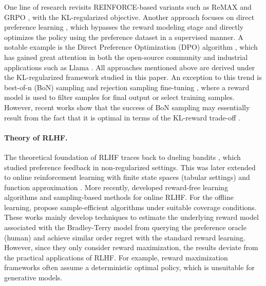 \documentclass[11pt]{article}
\begin{document}
One line of research revisits REINFORCE-based variants such as ReMAX and GRPO \citep{li2023remax, shao2024deepseekmath}, with the KL-regularized objective. Another approach focuses on direct preference learning \citep{zhao2023slic, rafailov2023direct, azar2023general}, which bypasses the reward modeling stage and directly optimizes the policy using the preference dataset in a supervised manner. A notable example is the Direct Preference Optimization (DPO) algorithm \citep{rafailov2023direct}, which has gained great attention in both the open-source community \citep{tunstall2023zephyr, lambert2024t} and industrial applications such as Llama \citep{dubey2024llama}. All approaches mentioned above are derived under the KL-regularized framework studied in this paper. An exception to this trend is best-of-n (BoN) sampling and rejection sampling fine-tuning \citep{bai2022training, dong2023raft, touvron2023llama}, where a reward model is used to filter samples for final output or select training samples. However, recent works show that the success of BoN sampling may essentially result from the fact that it is optimal in terms of the KL-reward trade-off \citep{gui2024bonbon, yang2024asymptotics}.


\paragraph{Theory of RLHF.} The theoretical foundation of RLHF traces back to dueling bandits \citep[e.g.,][]{yue2012k,saha2021optimal,bengs2021preference}, which studied preference feedback in non-regularized settings. This was later extended to online reinforcement learning with finite state spaces (tabular settings) and function approximation \citep{xu2020preference, novoseller2020dueling, pacchiano2021dueling, chen2022human}. More recently, \citet{zhan2023query, wu2023making} developed reward-free learning algorithms and sampling-based methods for online RLHF. For the offline learning,  \citet{zhu2023principled, zhan2023provable, li2023reinforcement, zhong2024dpo, huang2024correcting} propose sample-efficient algorithms under suitable coverage conditions. These works mainly develop techniques to estimate the underlying reward model associated with the Bradley-Terry model from querying the preference oracle (human) and achieve similar order regret with the standard reward learning. However, since they only consider reward maximization, the results deviate from the practical applications of RLHF. For example, reward maximization frameworks often assume a deterministic optimal policy, which is unsuitable for generative models.
\end{document}
